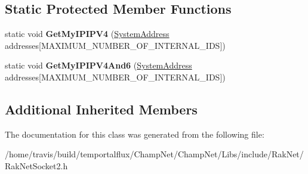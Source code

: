 \subsection*{Static Protected Member Functions}
\begin{DoxyCompactItemize}
\item 
\hypertarget{class_rak_net_1_1_r_n_s2___linux_ad5c837d7655bfe3eb02264b4fa9a9871}{static void {\bfseries Get\-My\-I\-P\-I\-P\-V4} (\hyperlink{struct_rak_net_1_1_system_address}{System\-Address} addresses\mbox{[}M\-A\-X\-I\-M\-U\-M\-\_\-\-N\-U\-M\-B\-E\-R\-\_\-\-O\-F\-\_\-\-I\-N\-T\-E\-R\-N\-A\-L\-\_\-\-I\-D\-S\mbox{]})}\label{class_rak_net_1_1_r_n_s2___linux_ad5c837d7655bfe3eb02264b4fa9a9871}

\item 
\hypertarget{class_rak_net_1_1_r_n_s2___linux_a035a3fb4f7841243ca2fbec9fd21f715}{static void {\bfseries Get\-My\-I\-P\-I\-P\-V4\-And6} (\hyperlink{struct_rak_net_1_1_system_address}{System\-Address} addresses\mbox{[}M\-A\-X\-I\-M\-U\-M\-\_\-\-N\-U\-M\-B\-E\-R\-\_\-\-O\-F\-\_\-\-I\-N\-T\-E\-R\-N\-A\-L\-\_\-\-I\-D\-S\mbox{]})}\label{class_rak_net_1_1_r_n_s2___linux_a035a3fb4f7841243ca2fbec9fd21f715}

\end{DoxyCompactItemize}
\subsection*{Additional Inherited Members}


The documentation for this class was generated from the following file\-:\begin{DoxyCompactItemize}
\item 
/home/travis/build/temportalflux/\-Champ\-Net/\-Champ\-Net/\-Libs/include/\-Rak\-Net/Rak\-Net\-Socket2.\-h\end{DoxyCompactItemize}
